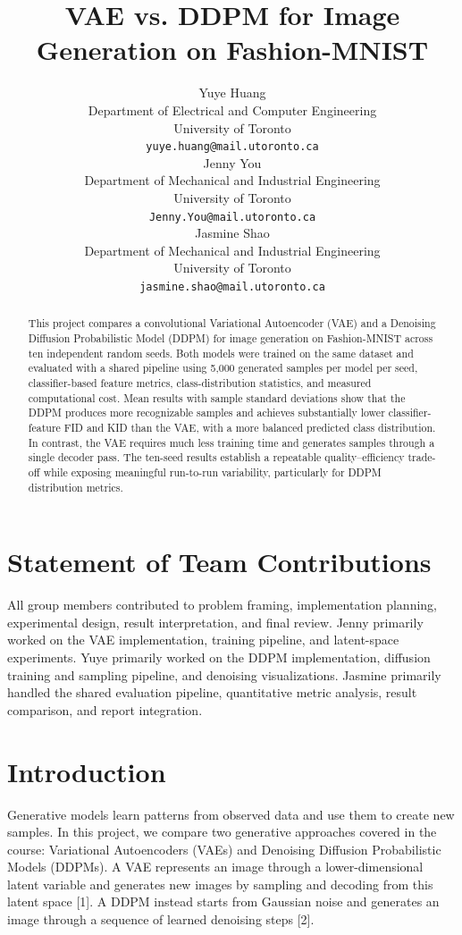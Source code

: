 \documentclass{article}
\title{VAE vs. DDPM for Image Generation on Fashion-MNIST}
\author{%
  Yuye Huang\\
  Department of Electrical and Computer Engineering\\
  University of Toronto\\
  \texttt{yuye.huang@mail.utoronto.ca} \\
  \And
  Jenny You\\
  Department of Mechanical and Industrial Engineering\\
  University of Toronto\\
  \texttt{Jenny.You@mail.utoronto.ca} \\
  \And
  Jasmine Shao\\
  Department of Mechanical and Industrial Engineering\\
  University of Toronto\\
  \texttt{jasmine.shao@mail.utoronto.ca} \\
}
\begin{document}
\maketitle

\begin{abstract}
This project compares a convolutional Variational Autoencoder (VAE) and a Denoising Diffusion Probabilistic Model (DDPM) for image generation on Fashion-MNIST across ten independent random seeds. Both models were trained on the same dataset and evaluated with a shared pipeline using 5,000 generated samples per model per seed, classifier-based feature metrics, class-distribution statistics, and measured computational cost. Mean results with sample standard deviations show that the DDPM produces more recognizable samples and achieves substantially lower classifier-feature FID and KID than the VAE, with a more balanced predicted class distribution. In contrast, the VAE requires much less training time and generates samples through a single decoder pass. The ten-seed results establish a repeatable quality--efficiency trade-off while exposing meaningful run-to-run variability, particularly for DDPM distribution metrics.
\end{abstract}

\section*{Statement of Team Contributions}
All group members contributed to problem framing, implementation planning, experimental design, result interpretation, and final review. Jenny primarily worked on the VAE implementation, training pipeline, and latent-space experiments. Yuye primarily worked on the DDPM implementation, diffusion training and sampling pipeline, and denoising visualizations. Jasmine primarily handled the shared evaluation pipeline, quantitative metric analysis, result comparison, and report integration.

\section{Introduction}
Generative models learn patterns from observed data and use them to create new samples. In this project, we compare two generative approaches covered in the course: Variational Autoencoders (VAEs) and Denoising Diffusion Probabilistic Models (DDPMs). A VAE represents an image through a lower-dimensional latent variable and generates new images by sampling and decoding from this latent space [1]. A DDPM instead starts from Gaussian noise and generates an image through a sequence of learned denoising steps [2].
\end{document}
